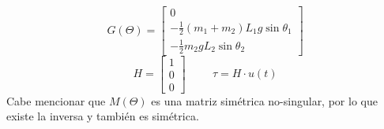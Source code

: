 \begin{equation}
 G\left( \Theta \right) = \begin{bmatrix}
0 \\
 - \frac{1}{2}(m_1+m_2)L_1g\sin\theta_1 \\
- \frac{1}{2}m_2gL_2\sin\theta_2
\end{bmatrix}
\end{equation}
\begin{equation}
 H = \begin{bmatrix}
1 \\
 0 \\
0
\end{bmatrix}
\hspace{1cm}
\tau = H\cdot u(t)
\end{equation}
Cabe mencionar que $M(\Theta)$ es una matriz simétrica no-singular, por lo que existe la inversa y también es simétrica.

